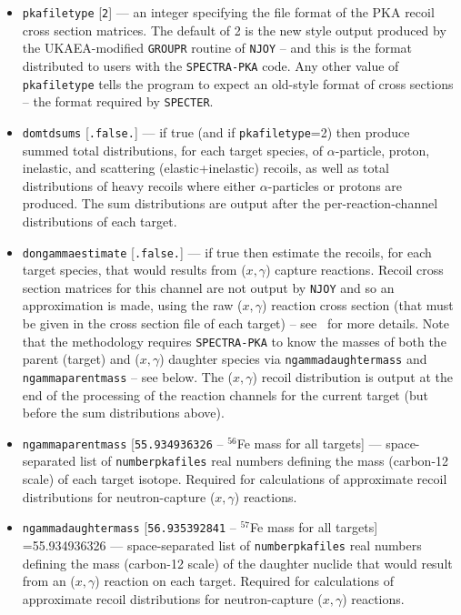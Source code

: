 \documentclass[a4paper]{article}
\begin{document}
\begin{itemize}
\item \texttt{pka{\textunderscore}filetype} [\texttt{2}] --- an integer specifying the file format of the PKA recoil cross section matrices. The default of 2 is the new style output produced by the UKAEA-modified \texttt{GROUPR} routine of \texttt{NJOY} -- and this is the format distributed to users with the \texttt{SPECTRA-PKA} code. Any other value of \texttt{pka{\textunderscore}filetype} tells the program to expect an old-style format of cross sections -- the format required by \texttt{SPECTER}.


\item \texttt{do{\textunderscore}mtd{\textunderscore}sums} [\texttt{.false.}] --- if true (and if \texttt{pka{\textunderscore}filetype}=2) then produce summed total distributions, for each target species, of \(\alpha\)-particle, proton, inelastic, and scattering (elastic+inelastic) recoils, as well as total distributions of heavy recoils where either \(\alpha\)-particles or protons are produced. The sum distributions are output after the per-reaction-channel distributions of each target.
\item \texttt{do{\textunderscore}ngamma{\textunderscore}estimate} [\texttt{.false.}]  --- if true then estimate the recoils, for each target species, that would results from (\(x,\gamma\)) capture reactions. Recoil cross section matrices for this channel are not output by \texttt{NJOY} and so an approximation is made, using the raw (\(x,\gamma\)) reaction cross section (that must be given in the cross section file of each target) -- see~\cite{gilbertmariansublet2015} for more details. Note that the methodology requires \texttt{SPECTRA-PKA} to know the masses of both the parent (target) and (\(x,\gamma\)) daughter species via \texttt{ngamma{\textunderscore}daughter{\textunderscore}mass} and  \texttt{ngamma{\textunderscore}parent{\textunderscore}mass} -- see below. The (\(x,\gamma\)) recoil distribution is output at the end of the processing of the reaction channels for the current target (but before the sum distributions above).
\item \texttt{ngamma{\textunderscore}parent{\textunderscore}mass} [\texttt{55.934936326} -- \(^{56}\)Fe mass for all targets] --- space-separated list of \texttt{number{\textunderscore}pka{\textunderscore}files} real numbers defining the mass (carbon-12 scale) of each target isotope. Required for calculations of approximate recoil distributions for neutron-capture (\(x,\gamma\)) reactions.
\item \texttt{ngamma{\textunderscore}daughter{\textunderscore}mass} [\texttt{56.935392841} -- \(^{57}\)Fe mass for all targets] =55.934936326{\textunderscore} --- space-separated list of \texttt{number{\textunderscore}pka{\textunderscore}files} real numbers defining the mass (carbon-12 scale) of the daughter nuclide that would result from an (\(x,\gamma\)) reaction on each target. Required for calculations of approximate recoil distributions for neutron-capture (\(x,\gamma\)) reactions.


\end{itemize}
\end{document}
